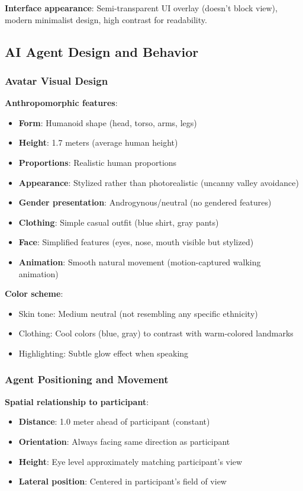 \documentclass[12pt]{article}
\begin{document}
\textbf{Interface appearance}: Semi-transparent UI overlay (doesn't block view), modern minimalist design, high contrast for readability.

\subsection{AI Agent Design and Behavior}

\subsubsection{Avatar Visual Design}

\textbf{Anthropomorphic features}:
\begin{itemize}
    \item \textbf{Form}: Humanoid shape (head, torso, arms, legs)
    \item \textbf{Height}: 1.7 meters (average human height)
    \item \textbf{Proportions}: Realistic human proportions
    \item \textbf{Appearance}: Stylized rather than photorealistic (uncanny valley avoidance)
    \item \textbf{Gender presentation}: Androgynous/neutral (no gendered features)
    \item \textbf{Clothing}: Simple casual outfit (blue shirt, gray pants)
    \item \textbf{Face}: Simplified features (eyes, nose, mouth visible but stylized)
    \item \textbf{Animation}: Smooth natural movement (motion-captured walking animation)
\end{itemize}

\textbf{Color scheme}:
\begin{itemize}
    \item Skin tone: Medium neutral (not resembling any specific ethnicity)
    \item Clothing: Cool colors (blue, gray) to contrast with warm-colored landmarks
    \item Highlighting: Subtle glow effect when speaking
\end{itemize}

\subsubsection{Agent Positioning and Movement}

\textbf{Spatial relationship to participant}:
\begin{itemize}
    \item \textbf{Distance}: 1.0 meter ahead of participant (constant)
    \item \textbf{Orientation}: Always facing same direction as participant
    \item \textbf{Height}: Eye level approximately matching participant's view
    \item \textbf{Lateral position}: Centered in participant's field of view
\end{itemize}
\end{document}

